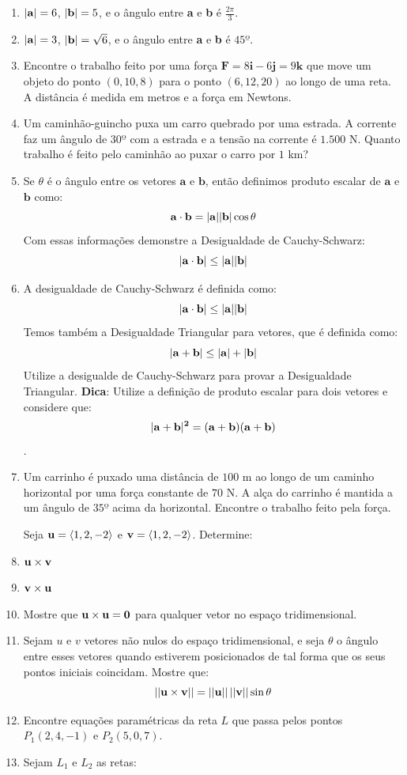 \documentclass[11pt,a4paper]{article}
\begin{document}
\begin{enumerate}
	 
	\item ${\bf|a|} = 6$, \quad ${\bf|b|} = 5$, e o ângulo entre \textbf{a} e \textbf{b} é $\displaystyle			\frac{2\pi}{3}$.
	\item ${\bf|a|} = 3$, \quad ${\bf|b|} = \sqrt{6}$, e o ângulo entre \textbf{a} e \textbf{b} é $45º$.	
	\item Encontre o trabalho feito por uma força $\textbf{F} = 8\textbf{i} - 6\textbf{j} = 9\textbf{k}$ 			que move um objeto do ponto $(0, 10, 8)$ para o ponto $(6, 12, 20)$ ao longo de uma reta. A distância é 	medida em metros e a força em Newtons. 
	\item Um caminhão-guincho puxa um carro quebrado por uma estrada. A corrente faz um ângulo de $30º$ com 	a estrada e a tensão na corrente é $1.500$ N. Quanto trabalho é feito pelo caminhão ao puxar o carro 			por $1$ km?
	\item Se $\theta$ é o ângulo entre os vetores $\textbf{a}$ e $\textbf{b}$, então definimos produto 	    		escalar de $\textbf{a}$ e $\textbf{b}$ como:
	$$ \bf{a} \cdot b = |a||b|\cos {\theta} $$
	Com essas informações demonstre a Desigualdade de Cauchy-Schwarz:
	$$\bf|a \cdot b| \leq |a||b|$$
	\item A desigualdade de Cauchy-Schwarz é definida como:
	$$\bf|a \cdot b| \leq |a||b|$$
	Temos também a Desigualdade Triangular para vetores, que é definida como:
	$${\bf|a + b|} \leq {\bf|a| + |b|}$$
	Utilize a desigualde de Cauchy-Schwarz para provar a Desigualdade Triangular.	
	\textbf{Dica}: Utilize a definição de produto escalar para dois vetores e considere que: $$\bf|a + b|^2 	= (a 	+ b)(a + b)$$.
	\item Um carrinho é puxado uma distância de $100$ m ao longo de um caminho horizontal por uma força 			constante de $70$ N. A alça do carrinho é mantida a um ângulo de $35º$ acima da horizontal. Encontre o 			trabalho feito pela força.
		
	Seja ${\bf u} = \langle 1, 2, -2 \rangle$ e ${\bf v} = \langle 1, 2, -2 \rangle$. 	Determine:	
	
	\item $\bf u \times v$
	
	
	
	\item $\bf v \times u$
	\item Mostre que $\bf u \times u = 0$ para qualquer vetor no espaço tridimensional.
	\item Sejam $u$ e $v$ vetores não nulos do espaço tridimensional, e seja $\theta$ o ângulo entre esses vetores quando estiverem posicionados de tal forma que os seus pontos iniciais coincidam. Mostre que:
	$$\bf ||u \times v|| = ||u||\,||v||\sin \theta $$
	\item Encontre equações paramétricas da reta $L$ que passa pelos pontos $P_1 (2,4,-1)$ e $P_2 (5,0,7)$.
	\item Sejam $L_1$ e $L_2$ as retas:
	

\end{enumerate}
\end{document}
